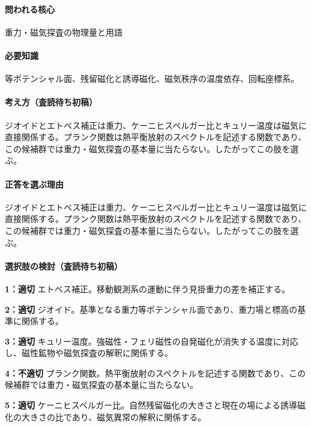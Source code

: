 \paragraph{問われる核心} 重力・磁気探査の物理量と用語

\paragraph{必要知識} 等ポテンシャル面、残留磁化と誘導磁化、磁気秩序の温度依存、回転座標系。

\paragraph{考え方（査読待ち初稿）} ジオイドとエトベス補正は重力、ケーニヒスベルガー比とキュリー温度は磁気に直接関係する。プランク関数は熱平衡放射のスペクトルを記述する関数であり、この候補群では重力・磁気探査の基本量に当たらない。したがってこの肢を選ぶ。

\paragraph{正答を選ぶ理由} ジオイドとエトベス補正は重力、ケーニヒスベルガー比とキュリー温度は磁気に直接関係する。プランク関数は熱平衡放射のスペクトルを記述する関数であり、この候補群では重力・磁気探査の基本量に当たらない。したがってこの肢を選ぶ。

\paragraph{選択肢の検討（査読待ち初稿）}\mbox{}\par

\noindent\textbf{1：適切} エトベス補正。移動観測系の運動に伴う見掛重力の差を補正する。\par

\noindent\textbf{2：適切} ジオイド。基準となる重力等ポテンシャル面であり、重力場と標高の基準に関係する。\par

\noindent\textbf{3：適切} キュリー温度。強磁性・フェリ磁性の自発磁化が消失する温度に対応し、磁性鉱物や磁気探査の解釈に関係する。\par

\noindent\textbf{4：不適切} プランク関数。熱平衡放射のスペクトルを記述する関数であり、この候補群では重力・磁気探査の基本量に当たらない。\par

\noindent\textbf{5：適切} ケーニヒスベルガー比。自然残留磁化の大きさと現在の場による誘導磁化の大きさの比であり、磁気異常の解釈に関係する。\par

